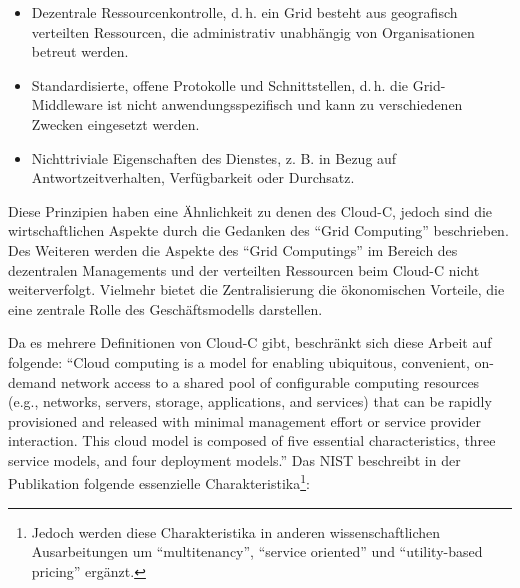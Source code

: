 \begin{itemize}
	\item Dezentrale Ressourcenkontrolle, d.\,h. ein Grid besteht aus geografisch verteilten Ressourcen, die administrativ unabhängig von Organisationen betreut werden.	
	\item Standardisierte, offene Protokolle und Schnittstellen, d.\,h. die Grid-Middleware
	ist nicht anwendungsspezifisch und kann zu verschiedenen Zwecken eingesetzt
	werden.
	\item Nichttriviale Eigenschaften des Dienstes, z. B. in Bezug auf Antwortzeitverhalten, Verfügbarkeit oder Durchsatz.
\end{itemize}
Diese Prinzipien haben eine Ähnlichkeit zu denen des \ac{Cloud-C}, jedoch sind die wirtschaftlichen Aspekte durch die Gedanken des \enquote{Grid Computing} beschrieben. Des Weiteren werden die Aspekte des \enquote{Grid Computings} im Bereich des dezentralen Managements und der verteilten Ressourcen beim \ac{Cloud-C} nicht weiterverfolgt. Vielmehr bietet die Zentralisierung die ökonomischen Vorteile, die eine zentrale Rolle des Geschäftsmodells darstellen. \par
Da es mehrere Definitionen von \ac{Cloud-C} gibt, beschränkt sich diese Arbeit auf folgende: \enquote{Cloud computing is a model for enabling ubiquitous, convenient, on-demand network access to a shared pool of configurable computing resources (e.g., networks, servers, storage, applications, and services) that can be rapidly provisioned and released with minimal management effort or service provider interaction. This cloud model is composed of five essential characteristics, three service models, and four deployment models.}\autocite[][S.\,2]{mell_nist_2011} Das \ac{NIST} beschreibt in der Publikation \cite{mell_nist_2011} folgende essenzielle Charakteristika\footnote{Jedoch werden diese Charakteristika in anderen wissenschaftlichen Ausarbeitungen um \enquote{multitenancy}, \enquote{service oriented} und \enquote{utility-based pricing} ergänzt.\autocite[vgl.][S.\,1]{institute_of_electrical_and_electronics_engineers_cloud_2011}}: 

